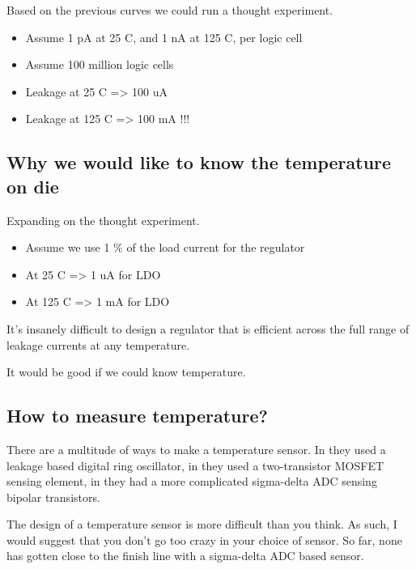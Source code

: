 Based on the previous curves we could run a thought experiment.

\begin{itemize}
\item
  Assume 1 pA at 25 C, and 1 nA at 125 C, per logic cell
\item
  Assume 100 million logic cells
\item
  Leakage at 25 C =\textgreater{} 100 uA
\item
  Leakage at 125 C =\textgreater{} 100 mA !!!
\end{itemize}

\subsection{Why we would like to know the temperature on
die}\label{why-we-would-like-to-know-the-temperature-on-die}

Expanding on the thought experiment.

\begin{itemize}
\item
  Assume we use 1 \% of the load current for the regulator
\item
  At 25 C =\textgreater{} 1 uA for LDO
\item
  At 125 C =\textgreater{} 1 mA for LDO
\end{itemize}

It's insanely difficult to design a regulator that is efficient across
the full range of leakage currents at any temperature.

It would be good if we could know temperature.

\subsection{How to measure
temperature?}\label{how-to-measure-temperature}

There are a multitude of ways to make a temperature sensor. In
 they used a leakage based digital ring
oscillator, in  they used a
two-transistor MOSFET sensing element, in
 they had a more complicated
sigma-delta ADC sensing bipolar transistors.

The design of a temperature sensor is more difficult than you think. As
such, I would suggest that you don't go too crazy in your choice of
sensor. So far, none has gotten close to the finish line with a
sigma-delta ADC based sensor.

